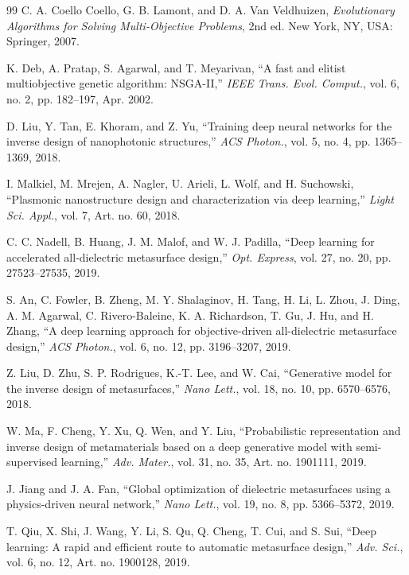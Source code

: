 \documentclass[journal]{IEEEtran}
\begin{document}
\begin{thebibliography}{99}
 C. A. Coello Coello, G. B. Lamont, and D. A. Van Veldhuizen, \textit{Evolutionary Algorithms for Solving Multi-Objective Problems}, 2nd ed. New York, NY, USA: Springer, 2007.

 K. Deb, A. Pratap, S. Agarwal, and T. Meyarivan, ``A fast and elitist multiobjective genetic algorithm: NSGA-II,'' \textit{IEEE Trans. Evol. Comput.}, vol. 6, no. 2, pp. 182--197, Apr. 2002.

 D. Liu, Y. Tan, E. Khoram, and Z. Yu, ``Training deep neural networks for the inverse design of nanophotonic structures,'' \textit{ACS Photon.}, vol. 5, no. 4, pp. 1365--1369, 2018.

 I. Malkiel, M. Mrejen, A. Nagler, U. Arieli, L. Wolf, and H. Suchowski, ``Plasmonic nanostructure design and characterization via deep learning,'' \textit{Light Sci. Appl.}, vol. 7, Art. no. 60, 2018.

 C. C. Nadell, B. Huang, J. M. Malof, and W. J. Padilla, ``Deep learning for accelerated all-dielectric metasurface design,'' \textit{Opt. Express}, vol. 27, no. 20, pp. 27523--27535, 2019.

 S. An, C. Fowler, B. Zheng, M. Y. Shalaginov, H. Tang, H. Li, L. Zhou, J. Ding, A. M. Agarwal, C. Rivero-Baleine, K. A. Richardson, T. Gu, J. Hu, and H. Zhang, ``A deep learning approach for objective-driven all-dielectric metasurface design,'' \textit{ACS Photon.}, vol. 6, no. 12, pp. 3196--3207, 2019.

 Z. Liu, D. Zhu, S. P. Rodrigues, K.-T. Lee, and W. Cai, ``Generative model for the inverse design of metasurfaces,'' \textit{Nano Lett.}, vol. 18, no. 10, pp. 6570--6576, 2018.

 W. Ma, F. Cheng, Y. Xu, Q. Wen, and Y. Liu, ``Probabilistic representation and inverse design of metamaterials based on a deep generative model with semi-supervised learning,'' \textit{Adv. Mater.}, vol. 31, no. 35, Art. no. 1901111, 2019.

 J. Jiang and J. A. Fan, ``Global optimization of dielectric metasurfaces using a physics-driven neural network,'' \textit{Nano Lett.}, vol. 19, no. 8, pp. 5366--5372, 2019.

 T. Qiu, X. Shi, J. Wang, Y. Li, S. Qu, Q. Cheng, T. Cui, and S. Sui, ``Deep learning: A rapid and efficient route to automatic metasurface design,'' \textit{Adv. Sci.}, vol. 6, no. 12, Art. no. 1900128, 2019.


\end{thebibliography}
\end{document}
